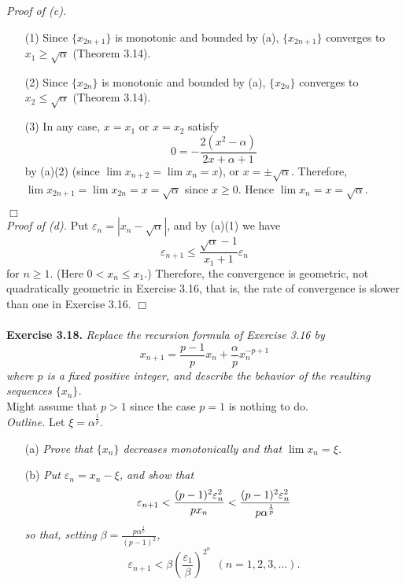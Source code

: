\documentclass{article}
\begin{document}
\emph{Proof of (c).}
\begin{enumerate}
\item[(1)]
  Since $\{x_{2n+1}\}$ is monotonic and bounded by (a),
  $\{x_{2n+1}\}$ converges to $x_1 \geq \sqrt{\alpha}$ (Theorem 3.14).
\item[(2)]
  Since $\{x_{2n}\}$ is monotonic and bounded by (a),
  $\{x_{2n}\}$ converges to $x_2 \leq \sqrt{\alpha}$ (Theorem 3.14).
\item[(3)]
  In any case, $x = x_1$ or $x = x_2$ satisfy
  \[
    0 = -\frac{2(x^2 - \alpha)}{2x + \alpha + 1}
  \]
  by (a)(2)
  (since $\lim x_{n+2} = \lim x_n = x$),
  or $x = \pm \sqrt{\alpha}$.
  Therefore, $\lim x_{2n+1} = \lim x_{2n} = x = \sqrt{\alpha}$ since $x \geq 0$.
  Hence $\lim x_n = x = \sqrt{\alpha}$.
\end{enumerate}
$\Box$ \\

\emph{Proof of (d).}
Put $\varepsilon_n = |x_n - \sqrt{\alpha}|$, and by (a)(1) we have
$$\varepsilon_{n+1}
\leq \frac{\sqrt{\alpha} - 1}{x_1+1} \varepsilon_n$$
for $n \geq 1$. (Here $0 < x_n \leq x_1$.)
Therefore, the convergence is geometric, not quadratically geometric in Exercise 3.16,
that is, the rate of convergence is slower than one in Exercise 3.16.
$\Box$ \\\\






\textbf{Exercise 3.18.}
\emph{Replace the recursion formula of Exercise 3.16 by
$$x_{n+1} = \frac{p-1}{p} x_n + \frac{\alpha}{p} x_n^{-p+1}$$
where $p$ is a fixed positive integer,
and describe the behavior of the resulting sequences $\{x_n\}$.} \\

Might assume that $p > 1$ since the case $p = 1$ is nothing to do. \\

\emph{Outline.}
Let $\xi = \alpha^{\frac{1}{p}}$.
\begin{enumerate}
\item[(a)]
\emph{Prove that $\{x_n\}$ decreases monotonically and that
$\lim x_n = \xi$.}
\item[(b)]
\emph{Put $\varepsilon_n = x_n - \xi$, and show that
\[
  \varepsilon_{n+1}
  < \frac{(p-1)^2\varepsilon_n^2}{p x_n} \\
  < \frac{(p-1)^2\varepsilon_n^2}{p \alpha^{\frac{1}{p}}}
\]
so that, setting $\beta = \frac{p \alpha^{\frac{1}{p}}}{(p-1)^2}$,
$$\varepsilon_{n+1}
< \beta \left( \frac{\varepsilon_1}{\beta} \right)^{2^n} \:\: (n =1,2,3,\ldots).$$ } \\
\end{enumerate}
\end{document}
